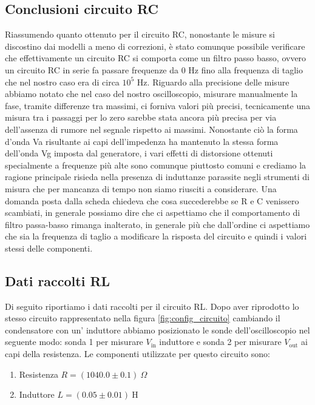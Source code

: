 \documentclass[letterpaper,12pt]{article}
\begin{document}
\subsection{Conclusioni circuito RC}
Riassumendo quanto ottenuto per il circuito RC, nonostante le misure si discostino dai modelli a meno di correzioni, è stato comunque possibile verificare che effettivamente un circuito RC si comporta come un filtro passo basso, ovvero un circuito RC in serie fa passare frequenze da 0 Hz fino alla frequenza di taglio che nel nostro caso era di circa $10^5 \text{ Hz}$.
Riguardo alla precisione delle misure abbiamo notato che nel caso del nostro oscilloscopio, misurare manualmente la fase, tramite differenze tra massimi, ci forniva valori più precisi, tecnicamente una misura tra i passaggi per lo zero sarebbe stata ancora più precisa per via dell'assenza di rumore nel segnale rispetto ai massimi.
Nonostante ciò la forma d'onda Va risultante ai capi dell'impedenza ha mantenuto la stessa forma dell'onda Vg imposta dal generatore, i vari effetti di distorsione ottenuti specialmente a frequenze più alte sono comunque piuttosto comuni e crediamo la ragione principale risieda nella presenza di induttanze parassite negli strumenti di misura che per mancanza di tempo non siamo riusciti a considerare. 
Una domanda posta dalla scheda chiedeva che cosa succederebbe se R e C venissero scambiati,
in generale possiamo dire che ci aspettiamo che il comportamento di filtro passa-basso rimanga inalterato, in generale più che dall'ordine ci aspettiamo che sia la frequenza di taglio a modificare la risposta del circuito e quindi i valori stessi delle componenti.

\subsection{Dati raccolti RL}
Di seguito riportiamo i dati raccolti per il circuito RL. Dopo aver riprodotto lo stesso circuito rappresentato nella figura \ref{fig:config_circuito} cambiando il condensatore con un' induttore abbiamo posizionato le sonde dell'oscilloscopio nel seguente modo: sonda 1 per misurare $V_\text{in}$ induttore e sonda 2 per misurare $V_\text{out}$ ai capi della resistenza.
Le componenti utilizzate per questo circuito sono:
\begin{enumerate}
	\item Resistenza $R = (1040.0 \pm0.1)\ \Omega$
	\item Induttore $L = (0.05\pm 0.01)\ \text{H}$
\end{enumerate}
\end{document}
